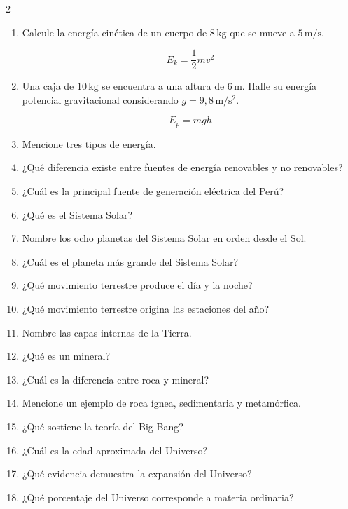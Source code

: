\documentclass[10pt]{article}
\begin{document}
\begin{multicols}{2}
\begin{enumerate}[label=\textbf{\arabic*.}, itemsep=0.45cm]
			\item Calcule la energía cinética de un cuerpo de
			$8\,\mathrm{kg}$ que se mueve a
			$5\,\mathrm{m/s}$.
			
			\[
			E_k = \frac{1}{2}mv^2
			\]
			
			\item Una caja de $10\,\mathrm{kg}$ se encuentra a una altura de $6\,\mathrm{m}$. Halle su energía potencial gravitacional considerando
			$g=9{,}8\,\mathrm{m/s^2}$.
			
			\[
			E_p = mgh
			\]
			
			\item Mencione tres tipos de energía.
			
			\item ¿Qué diferencia existe entre fuentes de energía renovables y no renovables?
			
			\item ¿Cuál es la principal fuente de generación eléctrica del Perú?
			
			\item ¿Qué es el Sistema Solar?
			
			\item Nombre los ocho planetas del Sistema Solar en orden desde el Sol.
			
			\item ¿Cuál es el planeta más grande del Sistema Solar?
			
			\item ¿Qué movimiento terrestre produce el día y la noche?
			
			\item ¿Qué movimiento terrestre origina las estaciones del año?
			
			\item Nombre las capas internas de la Tierra.
			
			\item ¿Qué es un mineral?
			
			\item ¿Cuál es la diferencia entre roca y mineral?
			
			\item Mencione un ejemplo de roca ígnea, sedimentaria y metamórfica.
			
			\item ¿Qué sostiene la teoría del Big Bang?
			
			\item ¿Cuál es la edad aproximada del Universo?
			
			\item ¿Qué evidencia demuestra la expansión del Universo?
			
			\item ¿Qué porcentaje del Universo corresponde a materia ordinaria?
			
		\end{enumerate}
		
	\end{multicols}
	
\end{document}
